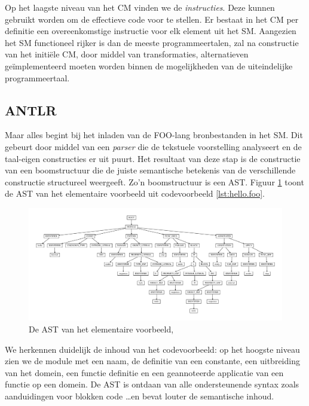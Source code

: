 Op het laagste niveau van het CM vinden we de \emph{instructies}. Deze kunnen
gebruikt worden om de effectieve code voor te stellen. Er bestaat in het CM per
definitie een overeenkomstige instructie voor elk element uit het SM. Aangezien
het SM functioneel rijker is dan de meeste programmeertalen, zal na constructie
van het initi\"ele CM, door middel van transformaties, alternatieven
ge\"implementeerd moeten worden binnen de mogelijkheden van de uiteindelijke
programmeertaal.

\subsection{ANTLR}
\label{subsection:devel-antlr}

Maar alles begint bij het inladen van de FOO-lang bronbestanden in het SM. Dit
gebeurt door middel van een \emph{parser} die de tekstuele voorstelling
analyseert en de taal-eigen constructies er uit puurt. Het resultaat van deze
stap is de constructie van een boomstructuur die de juiste semantische
betekenis van de verschillende constructie structureel weergeeft. Zo'n
boomstructuur is een AST. Figuur \ref{fig:devel-ast} toont de AST van het
elementaire voorbeeld uit codevoorbeeld \ref{lst:hello.foo}.

\begin{figure}[ht]
  \centering
  \includegraphics[width=\linewidth]{resources/hello_ast.pdf}
  \caption{De AST van het elementaire voorbeeld, }
  \label{fig:devel-ast}
\end{figure}

We herkennen duidelijk de inhoud van het codevoorbeeld: op het hoogste niveau
zien we de module met een naam, de definitie van een constante, een uitbreiding
van het domein, een functie definitie en een geannoteerde applicatie van een
functie op een domein. De AST is ontdaan van alle ondersteunende syntax zoals
aanduidingen voor blokken code \dots en bevat louter de semantische inhoud.
